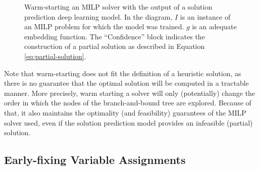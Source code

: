 \begin{figure}[h]
    \centering
    \caption{Warm-starting an MILP solver with the output of a solution prediction deep learning model. In the diagram,  $I$ is an instance of an MILP problem for which the model was trained. $g$ is an adequate embedding function. The ``Confidence'' block indicates the construction of a partial solution as described in Equation \eqref{eq:partial-solution}.}
    \label{fig:warm-starting-diagram}
\end{figure}

Note that warm-starting does not fit the definition of a heuristic solution, as there is no guarantee that the optimal solution will be computed in a tractable manner.
More precisely, warm starting a solver will only (potentially) change the order in which the nodes of the branch-and-bound tree are explored.
Because of that, it also maintains the optimality (and feasibility) guarantees of the MILP solver used, even if the solution prediction model provides an infeasible (partial) solution.


\subsection{Early-fixing Variable Assignments}

